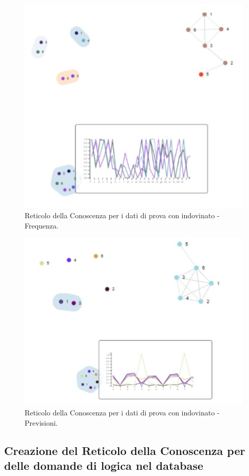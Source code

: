 \begin{figure}[H]
\centering
	\includegraphics[width=0.60\linewidth]{./image/collage_reticolo-probability-FREQ.png}
	\caption{Reticolo della Conoscenza per i dati di prova con indovinato - Frequenza.}
	\label{Reticolo della Conoscenza per i dati di prova con indovinato - Frequenza.}
\end{figure}
\noindent
\begin{figure}[H]
\centering
	\includegraphics[width=0.60\linewidth]{./image/collage_reticolo-probability.png}
	\caption{Reticolo della Conoscenza per i dati di prova con indovinato - Previsioni.}
	\label{Reticolo della Conoscenza per i dati di prova con indovinato - Previsioni.}
\end{figure}
\noindent


\subsection{Creazione del Reticolo della Conoscenza per delle domande di logica nel database}
\label{Creazione del Reticolo della Conoscenza per delle domande di logica nel database}


